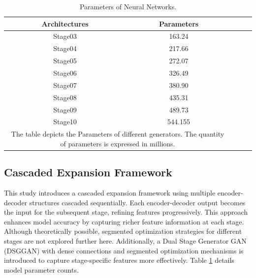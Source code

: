 \documentclass[twocolumn]{article}
\begin{document}
\begin{table}[h]
	\centering
	\caption{Parameters of Neural Networks.}
	\label{tab:model_parameters}
	\begin{tabular}{ccccc}
		\hline
		Architectures & Parameters \\
		\hline
		Stage03       & 163.24     \\
		Stage04       & 217.66     \\
		Stage05       & 272.07     \\
		Stage06       & 326.49     \\
		Stage07       & 380.90     \\
		Stage08       & 435.31     \\
		Stage09       & 489.73     \\
		Stage10       & 544.155    \\
		\hline
		\multicolumn{2}{p{201pt}}{The table depicts the Parameters of different generators. The quantity of parameters is expressed in millions.}
	\end{tabular}
\end{table}

\subsection{Cascaded Expansion Framework}

This study introduces a cascaded expansion framework using multiple encoder-decoder structures cascaded sequentially. Each encoder-decoder output becomes the input for the subsequent stage, refining features progressively. This approach enhances model accuracy by capturing richer feature information at each stage. Although theoretically possible, segmented optimization strategies for different stages are not explored further here. Additionally, a Dual Stage Generator GAN (DSGGAN) with dense connections and segmented optimization mechanisms is introduced to capture stage-specific features more effectively. Table \ref{tab:model_parameters} details model parameter counts.
\end{document}
